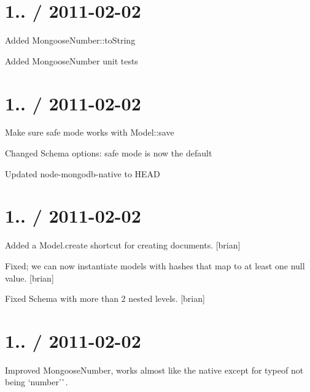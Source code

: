 \section*{1.. / 2011-\/02-\/02 }


\begin{DoxyItemize}
\item Added Mongoose\+Number\+::to\+String
\item Added Mongoose\+Number unit tests
\end{DoxyItemize}

\section*{1.. / 2011-\/02-\/02 }


\begin{DoxyItemize}
\item Make sure safe mode works with Model\+::save
\item Changed Schema options\+: safe mode is now the default
\item Updated node-\/mongodb-\/native to H\+E\+AD
\end{DoxyItemize}

\section*{1.. / 2011-\/02-\/02 }


\begin{DoxyItemize}
\item Added a Model.\+create shortcut for creating documents. \mbox{[}brian\mbox{]}
\item Fixed; we can now instantiate models with hashes that map to at least one null value. \mbox{[}brian\mbox{]}
\item Fixed Schema with more than 2 nested levels. \mbox{[}brian\mbox{]}
\end{DoxyItemize}

\section*{1.. / 2011-\/02-\/02 }


\begin{DoxyItemize}
\item Improved {\ttfamily Mongoose\+Number}, works almost like the native except for {\ttfamily typeof} not being `\textquotesingle{}number'\`{}. 
\end{DoxyItemize}
